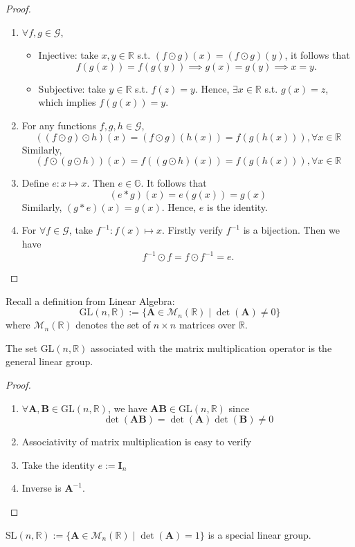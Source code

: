 \begin{proof}
\begin{enumerate}
\item
$\forall f,g\in\mathcal{G}$, 
\begin{itemize}
\item
Injective: take $x,y\in\mathbb{R}$ s.t. $(f\odot g)(x)=(f\odot g)(y)$, it follows that 
\[
f(g(x))=f(g(y))\implies g(x)=g(y)\implies x=y.
\]
\item
Subjective: take $y\in\mathbb{R}$ s.t. $f(z)=y$. Hence, $\exists x\in\mathbb{R}$ s.t. $g(x)=z$, which implies $f(g(x))=y$.
\end{itemize}
\item
For any functions $f,g,h\in\mathcal{G}$,
\[
((f\odot g)\odot h)(x) = (f\odot g)(h(x)) = f(g(h(x))), \forall x\in\mathbb{R}
\]
Similarly,
\[
(f\odot(g\odot h))(x) = f((g\odot h)(x)) = f(g(h(x))), \forall x\in\mathbb{R}
\]
\item
Define $e:x\mapsto x$. Then $e\in\mathbb{G}$. It follows that
\[
(e*g)(x) = e(g(x)) = g(x)
\]
Similarly, $(g*e)(x) = g(x)$. Hence, $e$ is the identity.
\item
For $\forall f\in\mathcal{G}$, take $f^{-1}: f(x)\mapsto x$. Firstly verify $f^{-1}$ is a bijection. Then we have
\[
f^{-1}\odot f = f\odot f^{-1} = e.
\]
\end{enumerate}
\end{proof}

Recall a definition from Linear Algebra:
\[
\mbox{GL}(n,\mathbb{R}):=\{\bm A\in\mathcal{M}_n(\mathbb{R})\mid \det(\bm A)\ne0\}
\]
where $\mathcal{M}_n(\mathbb{R})$ denotes the set of $n\times n$ matrices over $\mathbb{R}$.
\begin{proposition}
The set $\mbox{GL}(n,\mathbb{R})$ associated with the matrix multiplication operator is the general linear group.
\end{proposition}
\begin{proof}
\begin{enumerate}
\item
$\forall \bm A,\bm B\in\mbox{GL}(n,\mathbb{R})$, we have $\bm A\bm B\in\mbox{GL}(n,\mathbb{R})$ since
\[
\det(\bm A\bm B)=\det(\bm A)\det(\bm B)\ne0
\]
\item
Associativity of matrix multiplication is easy to verify
\item
Take the identity $e:=\bm I_n$
\item
Inverse is $\bm A^{-1}$.
\end{enumerate}
\end{proof}
\begin{remark}
$\mbox{SL}(n,\mathbb{R}):=\{\bm A\in\mathcal{M}_n(\mathbb{R})\mid \det(\bm A)=1\}$ is a special linear group.
\end{remark}

